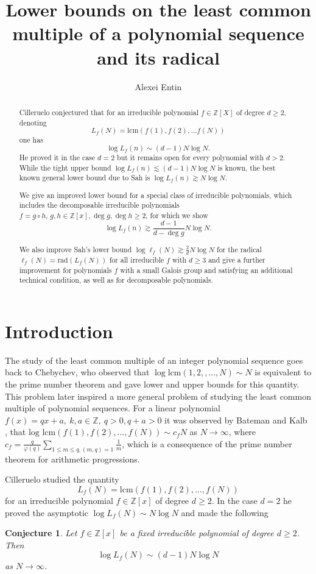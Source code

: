 \documentclass[alphabetic]{amsart}
\author{Alexei Entin}
\title{Lower bounds on the least common multiple of a polynomial sequence and its radical}
\newtheorem{conj}[claim]{Conjecture}
\theoremstyle{definition}
\numberwithin{equation}{section}
\newcommand{\Z}{{\mathbb Z}}
\newcommand{\lcm}{{\mathrm{lcm}}}
\numberwithin{equation}{section}
\begin{document}
\maketitle
\begin{abstract}
    Cilleruelo conjectured that for an irreducible polynomial $f \in \mathbb{Z}[X]$ of degree $d \geq 2$, denoting $$L_f(N)=\mathrm{lcm}(f(1),f(2),\ldots f(N))$$ one has $$\log L_f(n)\sim(d-1)N\log N.$$ He proved it in the case $d=2$ but it remains open for every polynomial with $d>2$.
    While the tight upper bound $\log L_f(n)\lesssim (d-1)N\log N$ is known, the best known general lower bound due to Sah is $\log L_f(n)\gtrsim N\log N.$

    We give an improved lower bound for a special class of irreducible polynomials, which includes the decomposable irreducible polynomials $f=g\circ h,\,g,h\in\Z[x],\deg g,\deg h\ge 2$, for which we show $$\log L_f(n)\gtrsim \frac{d-1}{d-\deg g}N\log N.$$

    We also improve Sah's lower bound $\log\ell_f(N)\gtrsim \frac 2dN\log N$ for the radical $\ell_f(N)=\mathrm{rad}(L_f(N))$ for all irreducible $f$ with $d\ge 3$ and give a further improvement
    for polynomials $f$ with a small Galois group and satisfying an additional technical condition, as well as for decomposable polynomials. 
\end{abstract}



\section{Introduction}
The study of the least common multiple of an integer polynomial sequence goes back to Chebychev, who observed that  $\log\lcm\left(1,2, ,\ldots, N\right) \sim N$ is equivalent to the prime number theorem and gave lower and upper bounds for this quantity. This problem later inspired a more general problem of studying the least common multiple of polynomial sequences. For a linear polynomial $f(x) = qx + a,\ k,a\in\Z,\ q>0, q+a > 0$ it was observed by Bateman and Kalb \cite{BKS02}, that
$\textrm{log lcm}\left(f\left(1\right),f(2),\ldots, f\left(N\right)\right) \sim c_f N$ as $N\to\infty$, where $c_f = \frac{q}{\varphi(q)} \sum_{1 \leq m \leq q,(m,q) = 1} \frac{1}{m}$, which is a consequence of the prime number theorem for arithmetic progressions. 

Cilleruelo \cite{Cil11} studied the quantity
\begin{equation}\label{eq: cilleruelo}L_f(N)=\textrm{lcm}\left(f\left(1\right),f(2),..., f\left(N\right)\right)\end{equation} for an irreducible polynomial $f\in\Z[x]$ of degree $d\ge 2$. In the case $d=2$ he proved the asymptotic $\log L_f(N)\sim N\log N$ and made the following
\begin{conj}\label{conj: cilleruelo}Let $f\in\Z[x]$ be a fixed irreducible polynomial of degree $d\ge 2$. Then \begin{equation}\label{eq: conj cil}\log L_f(N)\sim \left(d-1\right)N \log N\end{equation} as $N\to\infty$.\end{conj}
\end{document}
